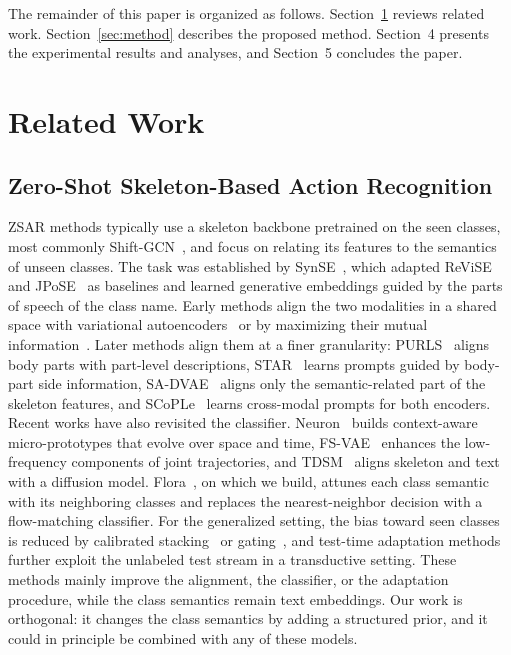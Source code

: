 \documentclass[11pt]{article}
\begin{document}
The remainder of this paper is organized as follows. Section~\ref{sec:related} reviews related work. Section~\ref{sec:method} describes the proposed method. Section~4 presents the experimental results and analyses, and Section~5 concludes the paper.


\section{Related Work}
\label{sec:related}

\subsection{Zero-Shot Skeleton-Based Action Recognition}

ZSAR methods typically use a skeleton backbone pretrained on the seen classes, most commonly Shift-GCN~\cite{shiftgcn}, and focus on relating its features to the semantics of unseen classes. The task was established by SynSE~\cite{synse21}, which adapted ReViSE~\cite{reVISE17} and JPoSE~\cite{jpose19} as baselines and learned generative embeddings guided by the parts of speech of the class name. Early methods align the two modalities in a shared space with variational autoencoders~\cite{cadavae19,gzssar23} or by maximizing their mutual information~\cite{smie23}. Later methods align them at a finer granularity: PURLS~\cite{purls24} aligns body parts with part-level descriptions, STAR~\cite{star24,starpp26} learns prompts guided by body-part side information, SA-DVAE~\cite{savae24} aligns only the semantic-related part of the skeleton features, and SCoPLe~\cite{scople25} learns cross-modal prompts for both encoders. Recent works have also revisited the classifier. Neuron~\cite{neuron25} builds context-aware micro-prototypes that evolve over space and time, FS-VAE~\cite{fsvae25} enhances the low-frequency components of joint trajectories, and TDSM~\cite{tdsm25} aligns skeleton and text with a diffusion model. Flora~\cite{flora26}, on which we build, attunes each class semantic with its neighboring classes and replaces the nearest-neighbor decision with a flow-matching classifier. For the generalized setting, the bias toward seen classes is reduced by calibrated stacking~\cite{chao16} or gating~\cite{gzssar23,scople25}, and test-time adaptation methods~\cite{skelcache,dynapurls} further exploit the unlabeled test stream in a transductive setting. These methods mainly improve the alignment, the classifier, or the adaptation procedure, while the class semantics remain text embeddings. Our work is orthogonal: it changes the class semantics by adding a structured prior, and it could in principle be combined with any of these models.
\end{document}
